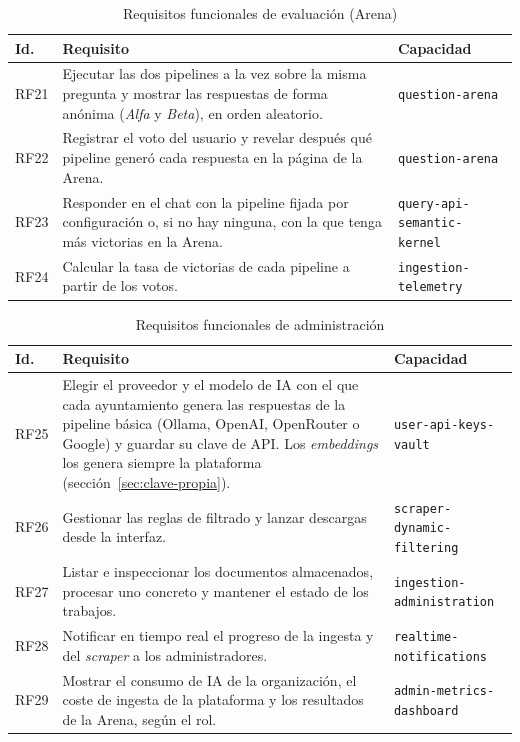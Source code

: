 \begin{table}[htbp]
\centering\small
\caption{Requisitos funcionales de evaluación (Arena)}
\label{tab:rf-arena}
\begin{tabularx}{\textwidth}{@{}l X l@{}}
\toprule
\textbf{Id.} & \textbf{Requisito} & \textbf{Capacidad} \\
\midrule
RF21 & Ejecutar las dos pipelines a la vez sobre la misma pregunta y mostrar las respuestas de forma anónima (\emph{Alfa} y \emph{Beta}), en orden aleatorio. & \texttt{question-arena} \\
RF22 & Registrar el voto del usuario y revelar después qué pipeline generó cada respuesta en la página de la Arena. & \texttt{question-arena} \\
RF23 & Responder en el chat con la pipeline fijada por configuración o, si no hay ninguna, con la que tenga más victorias en la Arena. & \texttt{query-api-semantic-kernel} \\
RF24 & Calcular la tasa de victorias de cada pipeline a partir de los votos. & \texttt{ingestion-telemetry} \\
\bottomrule
\end{tabularx}
\end{table}
\begin{table}[htbp]
\centering\small
\caption{Requisitos funcionales de administración}
\label{tab:rf-admin}
\begin{tabularx}{\textwidth}{@{}l X l@{}}
\toprule
\textbf{Id.} & \textbf{Requisito} & \textbf{Capacidad} \\
\midrule
RF25 & Elegir el proveedor y el modelo de IA con el que cada ayuntamiento genera las respuestas de la pipeline básica (Ollama, OpenAI, OpenRouter o Google) y guardar su clave de API. Los \emph{embeddings} los genera siempre la plataforma (sección~\ref{sec:clave-propia}). & \texttt{user-api-keys-vault} \\
RF26 & Gestionar las reglas de filtrado y lanzar descargas desde la interfaz. & \texttt{scraper-dynamic-filtering} \\
RF27 & Listar e inspeccionar los documentos almacenados, procesar uno concreto y mantener el estado de los trabajos. & \texttt{ingestion-administration} \\
RF28 & Notificar en tiempo real el progreso de la ingesta y del \emph{scraper} a los administradores. & \texttt{realtime-notifications} \\
RF29 & Mostrar el consumo de IA de la organización, el coste de ingesta de la plataforma y los resultados de la Arena, según el rol. & \texttt{admin-metrics-dashboard} \\
\bottomrule
\end{tabularx}
\end{table}


